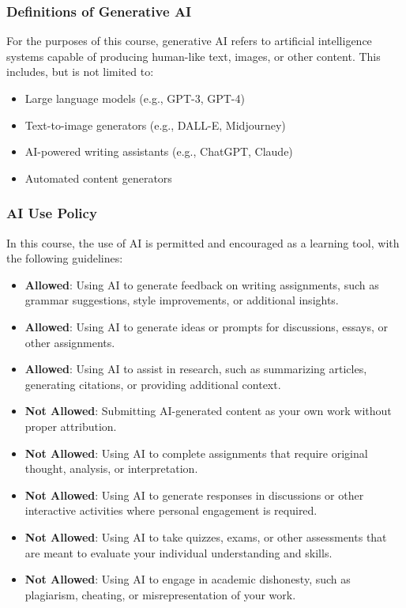 \documentclass[11pt, letterpaper]{article}
\begin{document}
\subsubsection*{Definitions of Generative AI}

\noindent For the purposes of this course, generative AI refers to artificial intelligence systems capable of producing human-like text, images, or other content. This includes, but is not limited to:

\begin{itemize}
    \item Large language models (e.g., GPT-3, GPT-4)
    \item Text-to-image generators (e.g., DALL-E, Midjourney)
    \item AI-powered writing assistants (e.g., ChatGPT, Claude)
    \item Automated content generators
\end{itemize}

\subsubsection*{AI Use Policy}

In this course, the use of AI is permitted and encouraged as a learning tool, with the following guidelines:

\begin{itemize}
    \item \textbf{Allowed}: Using AI to generate feedback on writing assignments, such as grammar suggestions, style improvements, or additional insights.
    \item \textbf{Allowed}: Using AI to generate ideas or prompts for discussions, essays, or other assignments.
    \item \textbf{Allowed}: Using AI to assist in research, such as summarizing articles, generating citations, or providing additional context.
    \item \textbf{Not Allowed}: Submitting AI-generated content as your own work without proper attribution.
    \item \textbf{Not Allowed}: Using AI to complete assignments that require original thought, analysis, or interpretation.
    \item \textbf{Not Allowed}: Using AI to generate responses in discussions or other interactive activities where personal engagement is required.
    \item \textbf{Not Allowed}: Using AI to take quizzes, exams, or other assessments that are meant to evaluate your individual understanding and skills.
    \item \textbf{Not Allowed}: Using AI to engage in academic dishonesty, such as plagiarism, cheating, or misrepresentation of your work.
\end{itemize}
\end{document}
